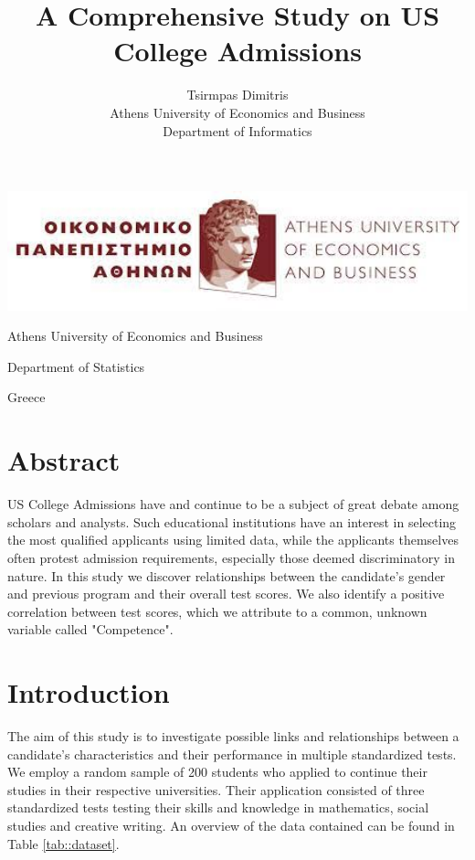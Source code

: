 \documentclass[10pt, a4paper]{article}
\title{\Huge A Comprehensive Study on US College Admissions  }
\author{\large Tsirmpas Dimitris\\Athens University of Economics and Business\\Department of Informatics}
\begin{document}
	
	\begin{titlepage}
		\maketitle
		\begin{center}
					
			\includegraphics[width=1\textwidth]{aueb_logo.jpg}
			
			\large Athens University of Economics and Business
			
			\large Department of Statistics
			
			\large Greece
		\end{center}
	
	\end{titlepage}
	
	\tableofcontents
	\newpage
	
	\section{Abstract}
	US College Admissions have and continue to be a subject of great debate among scholars and analysts. Such educational institutions have an interest in selecting the most qualified applicants using limited data, while the applicants themselves often protest admission requirements, especially those deemed discriminatory in nature. In this study we discover relationships between the candidate's gender and previous program and their overall test scores. We also identify a positive correlation between test scores, which we attribute to a common, unknown variable called "Competence".
	
	
	\section{Introduction}
	
	The aim of this study is to investigate possible links and relationships between a candidate's characteristics and their performance in multiple standardized tests. We employ a random sample of 200 students who applied to continue their studies in their respective universities. Their application consisted of three standardized tests testing their skills and knowledge in mathematics, social studies and creative writing. An overview of the data contained can be found in Table \ref{tab::dataset}. 
	
\end{document}
